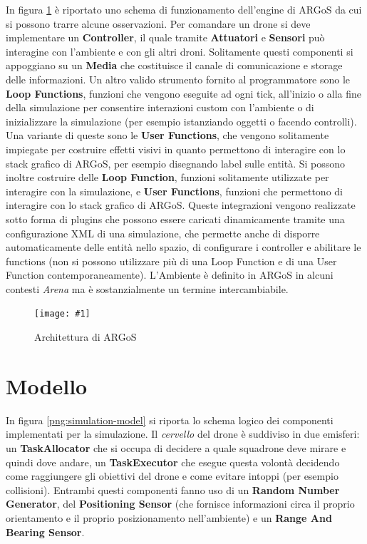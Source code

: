 \documentclass[a4paper,11pt,oneside, table]{article}
\newcommand{\putimage}[4] {
	\begin{figure}[H]
	    \centering
	    \texttt{[image: \#1]}
	    \caption{#2}\label{#3}
	\end{figure}
}
\begin{document}
In figura \ref{png:architecture} \`e riportato uno schema di funzionamento dell'engine di ARGoS da cui si possono trarre alcune osservazioni.
Per comandare un drone si deve implementare un \textbf{Controller}, il quale tramite \textbf{Attuatori} e \textbf{Sensori} pu\`o interagine con l'ambiente e con gli altri droni.
Solitamente questi componenti si appoggiano su un \textbf{Media} che costituisce il canale di comunicazione e storage delle informazioni.
Un altro valido strumento fornito al programmatore sono le \textbf{Loop Functions}, funzioni che vengono eseguite ad ogni tick, all'inizio o alla fine della simulazione per consentire interazioni custom con l'ambiente o di inizializzare la simulazione (per esempio istanziando oggetti o facendo controlli).
Una variante di queste sono le \textbf{User Functions}, che vengono solitamente impiegate per costruire effetti visivi in quanto permettono di interagire con lo stack grafico di ARGoS, per esempio disegnando label sulle entit\`a.
Si possono inoltre costruire delle \textbf{Loop Function}, funzioni solitamente utilizzate per interagire con la simulazione, e \textbf{User Functions}, funzioni che permettono di interagire con lo stack grafico di ARGoS.
Queste integrazioni vengono realizzate sotto forma di plugins che possono essere caricati dinamicamente tramite una configurazione XML di una simulazione, che permette anche di disporre automaticamente delle entit\`a nello spazio, di configurare i controller e abilitare le functions (non si possono utilizzare pi\`u di una Loop Function e di una User Function contemporaneamente).
L'Ambiente \`e definito in ARGoS in alcuni contesti \textit{Arena} ma \`e sostanzialmente un termine intercambiabile.

\putimage{images/architecture.png}{Architettura di ARGoS}{png:architecture}{0.99}

\section{Modello}

In figura \ref{png:simulation-model} si riporta lo schema logico dei componenti implementati per la simulazione.
Il \textit{cervello} del drone \`e suddiviso in due emisferi: un \textbf{TaskAllocator} che si occupa di decidere a quale squadrone deve mirare e quindi dove andare, un \textbf{TaskExecutor} che esegue questa volont\`a decidendo come raggiungere gli obiettivi del drone e come evitare intoppi (per esempio collisioni).
Entrambi questi componenti fanno uso di un \textbf{Random Number Generator}, del \textbf{Positioning Sensor} (che fornisce informazioni circa il proprio orientamento e il proprio posizionamento nell'ambiente) e un \textbf{Range And Bearing Sensor}.
\end{document}
